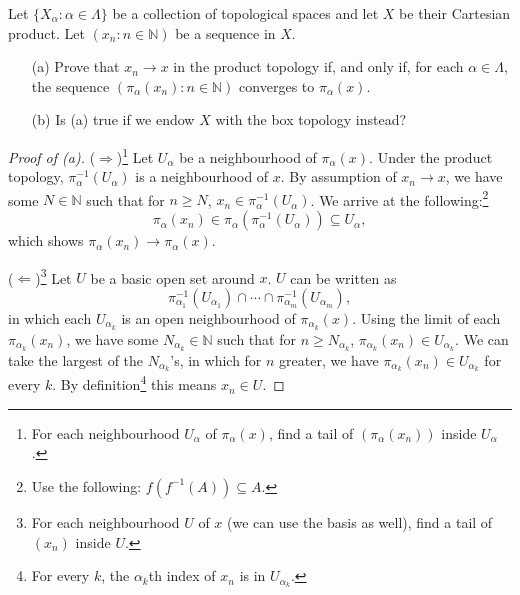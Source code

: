 \documentclass[../../main.tex]{subfiles}
\begin{document}
\begin{problem}[10]
Let $\{X_\alpha:\alpha\in\Lambda\}$ be a collection of topological spaces and let $X$ be their Cartesian product.
Let $(x_n:n\in\mathbb{N})$ be a sequence in $X$.
\begin{enumerate}
    \item[(a)] Prove that $x_n \to x$ in the product topology if, and only if, for each $\alpha\in\Lambda$, the sequence $(\pi_\alpha(x_n):n\in\mathbb{N})$ converges to $\pi_\alpha(x)$.
    \item[(b)] Is (a) true if we endow $X$ with the box topology instead?
\end{enumerate}
\end{problem}

\begin{proof}[Proof of (a)]
	($\Rightarrow$)\footnote{For each neighbourhood $U_\alpha$ of $\pi_\alpha(x)$, find a tail of $(\pi_\alpha(x_n))$ inside $U_\alpha$.}
	Let $U_\alpha$ be a neighbourhood of $\pi_\alpha(x)$.
	Under the product topology, $\pi^{-1}_\alpha(U_\alpha)$ is a neighbourhood of $x$.
	By assumption of $x_n \to x$, we have some $N \in \mathbb{N}$ such that for $n \ge N$, $x_n \in \pi^{-1}_\alpha(U_\alpha)$.
	We arrive at the following:\footnote{Use the following: $f(f^{-1}(A)) \subseteq A$.}
	\[
		\pi_\alpha(x_n) \in \pi_\alpha(\pi_\alpha^{-1}(U_\alpha)) \subseteq U_\alpha,
	\]
	which shows $\pi_\alpha(x_n) \to \pi_\alpha(x)$.

	($\Leftarrow$)\footnote{For each neighbourhood $U$ of $x$ (we can use the basis as well), find a tail of $(x_n)$ inside $U$.}
	Let $U$ be a basic open set around $x$.
	$U$ can be written as
	\[
		\pi_{\alpha_1}^{-1}(U_{\alpha_1}) \cap \cdots \cap \pi_{\alpha_m}^{-1}(U_{\alpha_m}),
	\]
	in which each $U_{\alpha_k}$ is an open neighbourhood of $\pi_{\alpha_k}(x)$.
	Using the limit of each $\pi_{\alpha_k}(x_n)$, we have some $N_{\alpha_k} \in \mathbb{N}$ such that for $n \ge N_{\alpha_k}$, $\pi_{\alpha_k}(x_n) \in U_{\alpha_k}$.
	We can take the largest of the $N_{\alpha_k}$'s, in which for $n$ greater, we have $\pi_{\alpha_k}(x_n) \in U_{\alpha_k}$ for every $k$.
    By definition\footnote{For every $k$, the $\alpha_k$th index of $x_n$ is in $U_{\alpha_k}$.}
    this means $x_n \in U$.
\end{proof}
\end{document}
